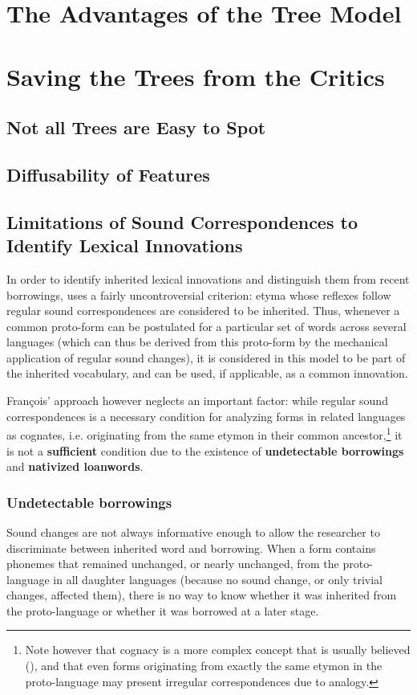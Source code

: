 \documentclass[oneside,a4paper,11pt]{article}
\begin{document}
 
\section{The Advantages of the Tree Model}
\section{Saving the Trees from the Critics}
\subsection{Not all Trees are Easy to Spot}
\subsection{Diffusability of Features}


\subsection{Limitations of Sound Correspondences to Identify Lexical Innovations}
In order to identify inherited lexical innovations and distinguish them from recent borrowings, \citet[176-8]{francois15tree} uses a fairly uncontroversial criterion: etyma whose reflexes follow regular sound correspondences are considered to be inherited. Thus, whenever a common proto-form can be postulated for a particular set of words across several languages (which can thus be derived from this proto-form by the mechanical application of regular sound changes), it is considered in this model to be part of the inherited vocabulary, and can be used, if applicable, as a common innovation.

François' approach however neglects an important factor: while regular sound correspondences is a necessary condition for analyzing forms in related languages as cognates, i.e. originating from the same etymon in their common ancestor,\footnote{Note however that cognacy is a more complex concept that is usually believed (\citealt{list16cognacy}), and that even forms originating from exactly the same etymon in the proto-language may present irregular correspondences due to analogy. } it is not a \textbf{sufficient} condition due to the existence of \textbf{undetectable borrowings} and \textbf{nativized loanwords}.  


\subsubsection{Undetectable borrowings}
Sound changes are not always informative enough to allow the researcher to discriminate between inherited word and borrowing. When a form contains phonemes that remained unchanged, or nearly unchanged, from the proto-language in all daughter languages (because no sound change, or only trivial changes, affected them), there is no way to know whether it was inherited from the proto-language or whether it was borrowed at a later stage. 
\end{document}
